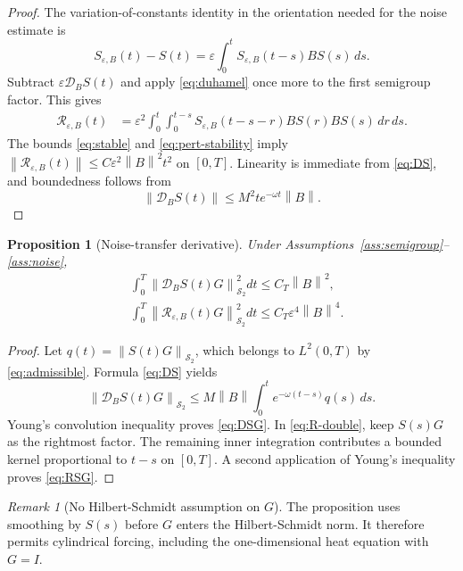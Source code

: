 \documentclass[11pt]{article}
\newtheorem{proposition}[assumption]{Proposition}
\theoremstyle{remark}
\newtheorem{remark}[assumption]{Remark}
\newcommand{\HS}{\mathcal S_2}
\newcommand{\norm}[1]{\left\lVert #1\right\rVert}
\begin{document}
\begin{proof}
The variation-of-constants identity in the orientation needed for the noise estimate is
\begin{equation}\label{eq:duhamel}
 S_{\varepsilon,B}(t)-S(t)
 =
 \varepsilon\int_0^t
 S_{\varepsilon,B}(t-s)BS(s)\,ds.
\end{equation}
Subtract $\varepsilon\mathcal D_BS(t)$ and apply \eqref{eq:duhamel} once more to the first semigroup factor. This gives
\begin{align}
 \mathcal R_{\varepsilon,B}(t)
 &=
 \varepsilon^2
 \int_0^t\int_0^{t-s}
 S_{\varepsilon,B}(t-s-r)BS(r)BS(s)
 \,dr\,ds.
 \label{eq:R-double}
\end{align}
The bounds \eqref{eq:stable} and \eqref{eq:pert-stability} imply
$\norm{\mathcal R_{\varepsilon,B}(t)}\le C\varepsilon^2\norm{B}^2t^2$ on $[0,T]$. Linearity is immediate from \eqref{eq:DS}, and boundedness follows from
\[
 \norm{\mathcal D_BS(t)}
 \le M^2t e^{-\omega t}\norm{B}.
\]
\end{proof}

\begin{proposition}[Noise-transfer derivative]\label{prop:noise-transfer}
Under Assumptions~\ref{ass:semigroup}--\ref{ass:noise},
\begin{align}
 &\int_0^T\norm{\mathcal D_BS(t)G}_{\HS}^2dt
 \le C_T\norm{B}^2,
 \label{eq:DSG}\\
 &\int_0^T
 \norm{\mathcal R_{\varepsilon,B}(t)G}_{\HS}^2dt
 \le C_T\varepsilon^4\norm{B}^4.
 \label{eq:RSG}
\end{align}
\end{proposition}

\begin{proof}
Let $q(t)=\norm{S(t)G}_{\HS}$, which belongs to $L^2(0,T)$ by \eqref{eq:admissible}. Formula \eqref{eq:DS} yields
\[
 \norm{\mathcal D_BS(t)G}_{\HS}
 \le M\norm{B}\int_0^te^{-\omega(t-s)}q(s)\,ds.
\]
Young's convolution inequality proves \eqref{eq:DSG}. In \eqref{eq:R-double}, keep $S(s)G$ as the rightmost factor. The remaining inner integration contributes a bounded kernel proportional to $t-s$ on $[0,T]$. A second application of Young's inequality proves \eqref{eq:RSG}.
\end{proof}

\begin{remark}[No Hilbert-Schmidt assumption on $G$]
The proposition uses smoothing by $S(s)$ before $G$ enters the Hilbert-Schmidt norm. It therefore permits cylindrical forcing, including the one-dimensional heat equation with $G=I$.
\end{remark}
\end{document}
